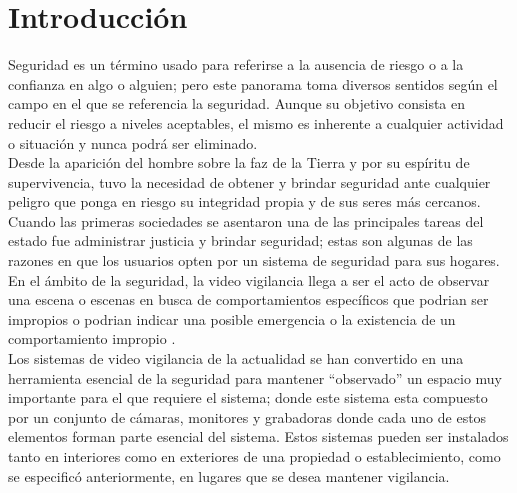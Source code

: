 \chapter{Introducción}

Seguridad es un término usado para referirse a la ausencia de riesgo o a la confianza en algo o alguien; pero este panorama toma diversos sentidos según el campo en el que se referencia la seguridad. Aunque su objetivo consista en reducir el riesgo a niveles aceptables, el mismo es inherente a cualquier actividad o situación y nunca podrá ser eliminado.\\

Desde la aparición del hombre sobre la faz de la Tierra y por su espíritu de supervivencia, tuvo la necesidad de obtener y brindar seguridad ante cualquier peligro que ponga en riesgo su integridad propia y de sus seres más cercanos. Cuando las primeras sociedades se asentaron una de las principales tareas del estado fue administrar justicia y brindar seguridad; estas son algunas de las razones en que los usuarios opten por un sistema de seguridad para sus hogares.\\

En el ámbito de la seguridad, la video vigilancia llega a ser el acto de observar una escena o escenas en busca de comportamientos específicos que podrian ser impropios o podrian indicar una posible emergencia o la existencia de un comportamiento impropio \cite{NORMAN:201795}.\\

Los sistemas de video vigilancia de la actualidad se han convertido en una herramienta esencial de la seguridad para mantener ``observado'' un espacio muy importante para el que requiere el sistema; donde este sistema esta compuesto por un conjunto de cámaras, monitores y grabadoras donde cada uno de estos elementos forman parte esencial del sistema. Estos sistemas pueden ser instalados tanto en interiores como en exteriores de una propiedad o establecimiento, como se especificó anteriormente, en lugares que se desea mantener vigilancia.\\

